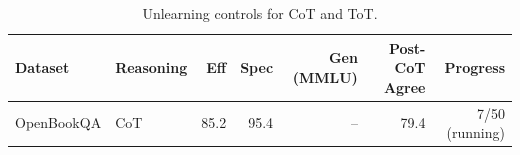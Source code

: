 \begin{table}[t]
\centering
\caption{Unlearning controls for CoT and ToT.}
\label{tab:cot-tot-controls}
\begin{tabular}{llrrrrr}
\toprule
Dataset & Reasoning & Eff & Spec & Gen (MMLU) & Post-CoT Agree & Progress \\
\midrule
OpenBookQA & CoT & 85.2 & 95.4 & -- & 79.4 & 7/50 (running) \\
\bottomrule
\end{tabular}
\end{table}
